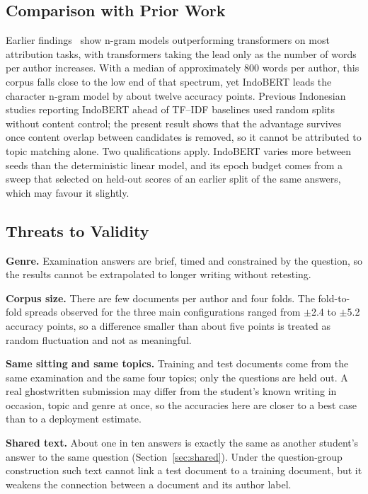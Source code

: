 \documentclass[runningheads]{llncs}
\begin{document}
\subsection{Comparison with Prior Work}

Earlier findings~\cite{Tyo2022} show n-gram models outperforming transformers on most attribution tasks, with transformers taking the lead only as the number of words per author increases. With a median of approximately 800 words per author, this corpus falls close to the low end of that spectrum, yet IndoBERT leads the character n-gram model by about twelve accuracy points. Previous Indonesian studies reporting IndoBERT ahead of TF--IDF baselines \cite{Saputra2023,Saputra2024} used random splits without content control; the present result shows that the advantage survives once content overlap between candidates is removed, so it cannot be attributed to topic matching alone. Two qualifications apply. IndoBERT varies more between seeds than the deterministic linear model, and its epoch budget comes from a sweep that selected on held-out scores of an earlier split of the same answers, which may favour it slightly.

\subsection{Threats to Validity}

\textbf{Genre.} Examination answers are brief, timed and constrained by the question, so the results cannot be extrapolated to longer writing without retesting.

\textbf{Corpus size.} There are few documents per author and four folds. The fold-to-fold spreads observed for the three main configurations ranged from $\pm$2.4 to $\pm$5.2 accuracy points, so a difference smaller than about five points is treated as random fluctuation and not as meaningful.

\textbf{Same sitting and same topics.} Training and test documents come from the same examination and the same four topics; only the questions are held out. A real ghostwritten submission may differ from the student's known writing in occasion, topic and genre at once, so the accuracies here are closer to a best case than to a deployment estimate.

\textbf{Shared text.} About one in ten answers is exactly the same as another student's answer to the same question (Section~\ref{sec:shared}). Under the question-group construction such text cannot link a test document to a training document, but it weakens the connection between a document and its author label.
\end{document}

